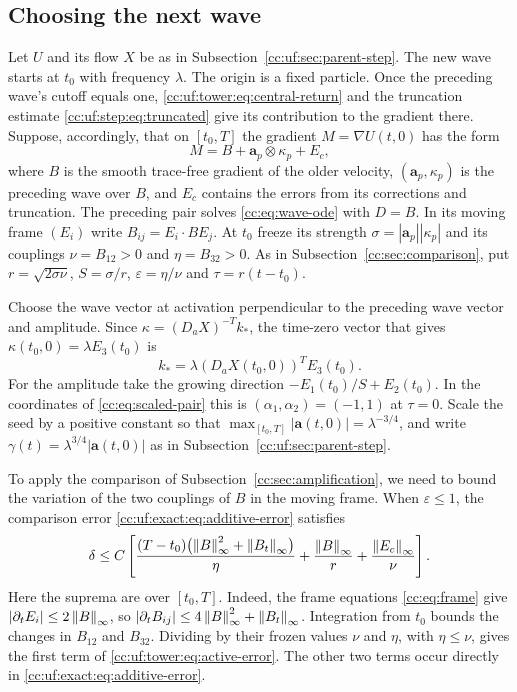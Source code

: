 \subsection{Choosing the next wave}\label{cc:uf:sec:later-wave}
Let $U$ and its flow $X$ be as in Subsection~\ref{cc:uf:sec:parent-step}.
The new wave starts at $t_0$ with frequency $\lambda$. The origin is a
fixed particle. Once the preceding wave's cutoff
equals one, \eqref{cc:uf:tower:eq:central-return} and the truncation
estimate \eqref{cc:uf:step:eq:truncated} give its contribution to the
gradient there. Suppose, accordingly, that on $[t_0,T]$ the gradient
$M=\nabla U(t,0)$ has the form
\begin{equation}\label{cc:uf:tower:eq:split}
 M=B+\mathbf a_p\otimes\kappa_p+E_c ,
\end{equation}
where $B$ is the smooth trace-free gradient of the older velocity, $(\mathbf a_p,\kappa_p)$ is
the preceding wave over $B$, and $E_c$ contains the errors from its
corrections and truncation. The preceding pair solves
\eqref{cc:eq:wave-ode} with $D=B$. In its moving frame $(E_i)$ write
$B_{ij}=E_i\cdot BE_j$. At $t_0$ freeze its strength
$\sigma=|\mathbf a_p||\kappa_p|$ and its couplings $\nu=B_{12}>0$ and
$\eta=B_{32}>0$. As in Subsection~\ref{cc:sec:comparison}, put
$r=\sqrt{2\sigma\nu}$, $S=\sigma/r$, $\varepsilon=\eta/\nu$ and
$\tau=r(t-t_0)$.

Choose the wave vector at activation perpendicular to the preceding
wave vector and amplitude. Since $\kappa=(D_aX)^{-T}k_*$, the
time-zero vector that gives $\kappa(t_0,0)=\lambda E_3(t_0)$ is
\[
 k_*=\lambda (D_aX(t_0,0))^TE_3(t_0).
\]
For the amplitude take the growing direction
$-E_1(t_0)/S+E_2(t_0)$. In the coordinates of \eqref{cc:eq:scaled-pair}
this is $(\alpha_1,\alpha_2)=(-1,1)$ at $\tau=0$. Scale the seed by a positive
constant so that $\max_{[t_0,T]}|\mathbf a(t,0)|=\lambda^{-3/4}$, and
write $\gamma(t)=\lambda^{3/4}|\mathbf a(t,0)|$ as in
Subsection~\ref{cc:uf:sec:parent-step}.

To apply the comparison of Subsection~\ref{cc:sec:amplification}, we need
to bound the variation of the two couplings of $B$ in the moving frame.
When $\varepsilon\le1$, the comparison error
\eqref{cc:uf:exact:eq:additive-error} satisfies
\begin{equation}\label{cc:uf:tower:eq:active-error}
 \delta\le C\left[
 \frac{(T-t_0)\bigl(\left\lVert B\right\rVert_\infty^2+\left\lVert B_t\right\rVert_\infty\bigr)}{\eta}
 +\frac{\left\lVert B\right\rVert_\infty}{r}+\frac{\left\lVert E_c\right\rVert_\infty}{\nu}\right].
\end{equation}
Here the suprema are over $[t_0,T]$. Indeed, the frame equations
\eqref{cc:eq:frame} give $|\partial_t E_i|\le2\left\lVert B\right\rVert_\infty$, so
$|\partial_t B_{ij}|\le4\left\lVert B\right\rVert_\infty^2+\left\lVert B_t\right\rVert_\infty$.
Integration from $t_0$ bounds the changes in $B_{12}$ and $B_{32}$.
Dividing by their frozen values $\nu$ and $\eta$, with $\eta\le\nu$,
gives the first term of \eqref{cc:uf:tower:eq:active-error}. The other
two terms occur directly in \eqref{cc:uf:exact:eq:additive-error}.

